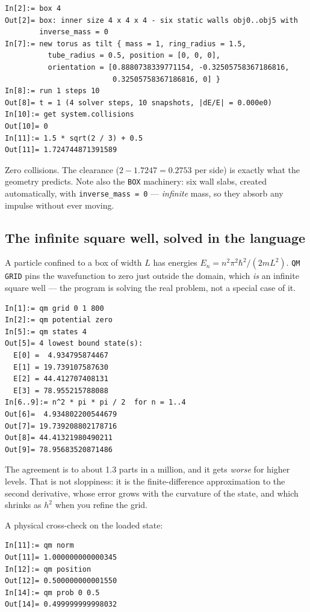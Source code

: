 \documentclass[11pt]{article}
\newcommand{\kw}[1]{\texttt{\uppercase{#1}}}
\newcommand{\code}[1]{\texttt{#1}}
\begin{document}
\begin{lstlisting}
In[2]:= box 4
Out[2]= box: inner size 4 x 4 x 4 - six static walls obj0..obj5 with
        inverse_mass = 0
In[7]:= new torus as tilt { mass = 1, ring_radius = 1.5,
          tube_radius = 0.5, position = [0, 0, 0],
          orientation = [0.8880738339771154, -0.32505758367186816,
                         0.32505758367186816, 0] }
In[8]:= run 1 steps 10
Out[8]= t = 1 (4 solver steps, 10 snapshots, |dE/E| = 0.000e0)
In[10]:= get system.collisions
Out[10]= 0
In[11]:= 1.5 * sqrt(2 / 3) + 0.5
Out[11]= 1.724744871391589
\end{lstlisting}

Zero collisions. The clearance ($2 - 1.7247 = 0.2753$ per side) is
exactly what the geometry predicts. Note also the \kw{box} machinery:
six wall slabs, created automatically, with \code{inverse\_mass = 0} ---
\emph{infinite} mass, so they absorb any impulse without ever moving.

\subsection{The infinite square well, solved in the language}

A particle confined to a box of width $L$ has energies
$E_n = n^2\pi^2\hbar^2/(2mL^2)$. \kw{qm grid} pins the wavefunction to
zero just outside the domain, which \emph{is} an infinite square well
--- the program is solving the real problem, not a special case of it.

\begin{lstlisting}
In[1]:= qm grid 0 1 800
In[2]:= qm potential zero
In[5]:= qm states 4
Out[5]= 4 lowest bound state(s):
  E[0] =  4.934795874467
  E[1] = 19.739107587630
  E[2] = 44.412707408131
  E[3] = 78.955215788088
In[6..9]:= n^2 * pi * pi / 2  for n = 1..4
Out[6]=  4.934802200544679
Out[7]= 19.739208802178716
Out[8]= 44.41321980490211
Out[9]= 78.95683520871486
\end{lstlisting}

The agreement is to about 1.3 parts in a million, and it gets
\emph{worse} for higher levels. That is not sloppiness: it is the
finite-difference approximation to the second derivative, whose error
grows with the curvature of the state, and which shrinks as $h^2$ when
you refine the grid.

A physical cross-check on the loaded state:

\begin{lstlisting}
In[11]:= qm norm
Out[11]= 1.000000000000345
In[12]:= qm position
Out[12]= 0.500000000001550
In[14]:= qm prob 0 0.5
Out[14]= 0.499999999998032
\end{lstlisting}
\end{document}

